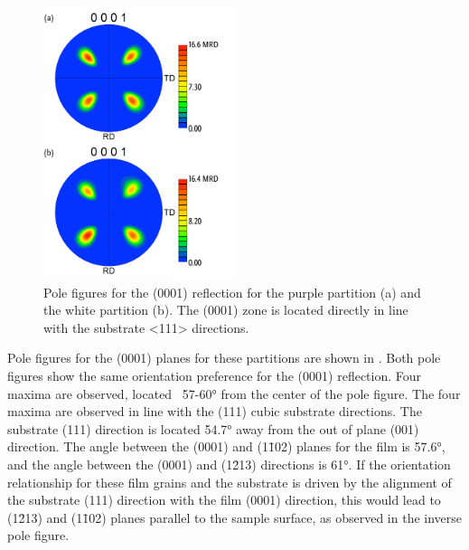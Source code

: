 \begin{figure}
\begin{center}
\includegraphics[width=0.5\textwidth]{purplewhite0001pole.pdf}
\caption[(0001) pole figures for purple and white grains]{%
	Pole figures for the (0001) reflection for the purple partition (a) 
	and the white partition (b). The (0001) zone is located directly in 
	line with the substrate <111> directions.}
\label{fig:purplewhite0001pole}
\end{center}
\end{figure}
Pole figures for the (0001) planes for these partitions are shown in
. Both pole figures show the same orientation preference
for the (0001) reflection. Four maxima are observed, located ~57-60\si{\degree} from the
center of the pole figure. The four maxima are observed in line with the (111) cubic
substrate directions. The substrate (111) direction is located 54.7\si{\degree} away from
the out of plane (001) direction. The angle between the (0001) and (1\={1}02) planes for
the  film is 57.6\si{\degree}, and the angle between the (0001) and (1\={2}13)
directions is 61\si{\degree}. If the orientation relationship for these film grains and
the substrate is driven by the alignment of the substrate (111) direction with the film
(0001) direction, this would lead to (1\={2}13) and (1\={1}02) planes parallel to the
sample surface, as observed in the inverse pole figure. 

